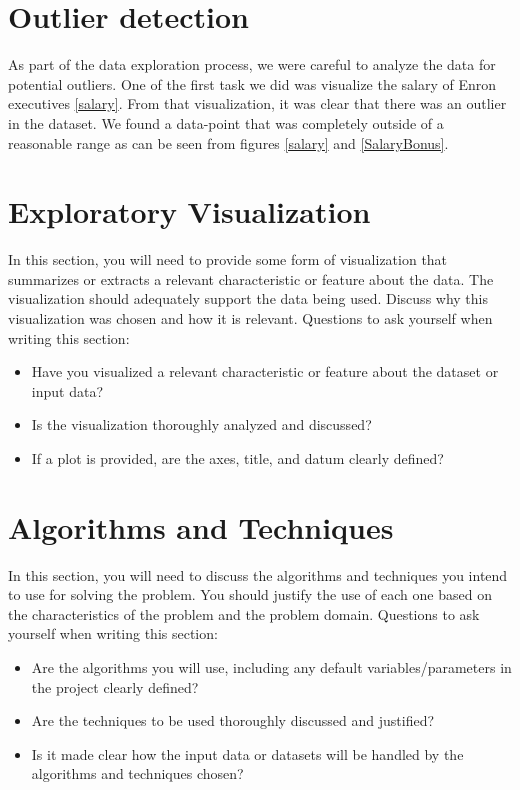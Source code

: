\documentclass[twoside,openright,titlepage,numbers=noenddot,headinclude,%
               footinclude=true,cleardoublepage=empty,abstractoff,BCOR=5mm,%
               paper=a4,fontsize=11pt,ngerman,american]{scrreprt}
\numberwithin{theorem}{chapter}
\numberwithin{definition}{chapter}
\numberwithin{algorithm}{chapter}
\numberwithin{figure}{chapter}
\numberwithin{table}{chapter}
\numberwithin{equation}{chapter}
\begin{document}
\section*{Outlier detection}
As part of the data exploration process, we were careful to analyze the data for potential outliers. One of the first task we did was visualize the salary of Enron executives \ref{salary}. From that visualization, it was clear that there was an outlier in the dataset. We found a data-point that was completely outside of a reasonable range as can be seen from figures \ref{salary} and \ref{SalaryBonus}. 


\section*{Exploratory Visualization}

In this section, you will need to provide some form of visualization that summarizes or extracts a relevant characteristic or feature about the data. The visualization should adequately support the data being used. Discuss why this visualization was chosen and how it is relevant. Questions to ask yourself when writing this section:
\begin{itemize}%
\item Have you visualized a relevant characteristic or feature about the dataset or input data?
\item Is the visualization thoroughly analyzed and discussed?
\item If a plot is provided, are the axes, title, and datum clearly defined?
\end{itemize}

\section*{Algorithms and Techniques}

In this section, you will need to discuss the algorithms and techniques you intend to use for solving the problem. You should justify the use of each one based on the characteristics of the problem and the problem domain. Questions to ask yourself when writing this section:
\begin{itemize}%
\item Are the algorithms you will use, including any default variables/parameters in the project clearly defined?
\item Are the techniques to be used thoroughly discussed and justified?
\item Is it made clear how the input data or datasets will be handled by the algorithms and techniques chosen?
\end{itemize}
\end{document}

